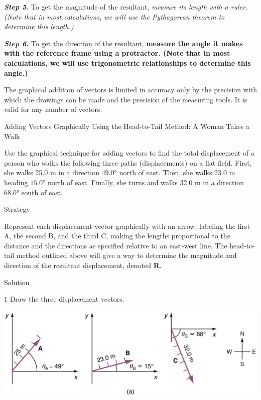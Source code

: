 \documentclass[
]{book}
\newenvironment{tinysection}{}{}
\begin{document}
\textbf{\emph{Step 5.}} To get the \protect\hypertarget{import-auto-id1165298794109}{}{magnitude} of the resultant, \emph{measure its length with a ruler.
(Note that in most calculations, we will use the Pythagorean theorem to
determine this length.)}

\textbf{\emph{Step 6.}} To get the \protect\hypertarget{import-auto-id1165298932041}{}{direction} of the resultant, \textbf{measure the angle it makes with
the reference frame using a protractor. (Note that in most calculations,
we will use trigonometric relationships to determine this angle.)}

The graphical addition of vectors is limited in accuracy only by the
precision with which the drawings can be made and the precision of the
measuring tools. It is valid for any number of vectors.

\hypertarget{fs-id1165296298332}{}
Adding Vectors Graphically Using the Head-to-Tail Method: A Woman Takes
a Walk

Use the graphical technique for adding vectors to find the total
displacement of a person who walks the following three paths
(displacements) on a flat field. First, she walks 25.0 m in a direction
\(\text{49.0°}{}\) north of east. Then, she walks 23.0 m heading
\(\text{15.0°}{}\) north of east. Finally, she turns and walks 32.0 m in a
direction 68.0° south of east.

\begin{tinysection}

{Strategy}

\end{tinysection}

Represent each displacement vector graphically with an arrow, labeling
the first \(\text{A}{}\), the second \(\text{B}{}\), and the third
\(\text{C}{}\), making the lengths proportional to the distance and the
directions as specified relative to an east-west line. The head-to-tail
method outlined above will give a way to determine the magnitude and
direction of the resultant displacement, denoted \(\textbf{R}{}\).

\begin{tinysection}

{Solution}

\end{tinysection}

\(1\) Draw the three displacement vectors.

\includegraphics{images/Figure_03_02_08.jpg}
\end{document}
